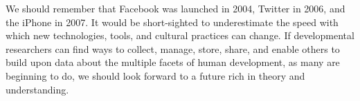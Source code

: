 \documentclass[letterpaper,man,apacite,natbib]{apa6}
\begin{document}
We should remember that Facebook was launched in 2004, Twitter in 2006, and the iPhone in 2007.
It would be short-sighted to underestimate the speed with which new technologies, tools, and cultural practices can change.
If developmental researchers can find ways to collect, manage, store, share, and enable others to build upon data about the multiple facets of human development, as many are beginning to do, we should look forward to a future rich in theory and understanding.


\end{document}
